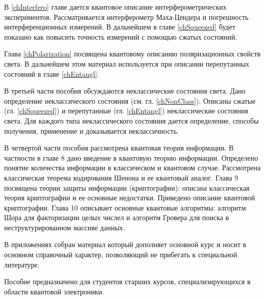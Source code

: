 В \ref{chInterfero} главе дается квантовое описание интерферометрических
экспериментов. Рассматривается интерферометр Маха-Цендера и
погрешность интерференционных измерений. В дальнейшем в главе
\ref{chSqueezed} будет показано как повысить точность измерений с
помощью сжатых состояний.

Глава \ref{chPolarization} посвящена квантовому описанию
поляризационных свойств света. В дальнейшем этом материал используется
при описании перепутанных состояний в главе \ref{chEntangl}.

В третьей части пособия обсуждаются неклассические
состояния света. Дано определение неклассического состояния
(см. гл. \ref{chNonClass}). Описаны 
сжатые (гл. \ref{chSqueezed}) и перепутанные (гл. \ref{chEntangl})
неклассические состояния света. Для каждого типа неклассического
состояния дается определение, способы получения, применение и доказывается
неклассичность.  

В четвертой части пособия рассмотрена квантовая теория информации. В
частности в главе 8 дано введение в квантовую теорию
информации. Определено понятие количества 
информации в классическом и квантовом случае. Рассмотрена классическая
теорема кодирования Шенона и ее квантовый аналог. Глава 9 посвящена
теории защиты информации (криптографии): описана классическая
теория криптографии и ее основные недостатки. Приведено описание
квантовой криптографии. Глава 10 описывает основные квантовые
алгоритмы: алгоритм Шора для факторизации целых числел и алгоритм
Гровера для поиска в неструктурированном массиве данных.

В приложениях собран материал который дополняет основной курс и носит
в основном справочный характер, позволяющий не прибегать к специальной
литературе. 

Пособие предназначено для студентов старших курсов, специализирующихся
в области квантовой электроники.  
